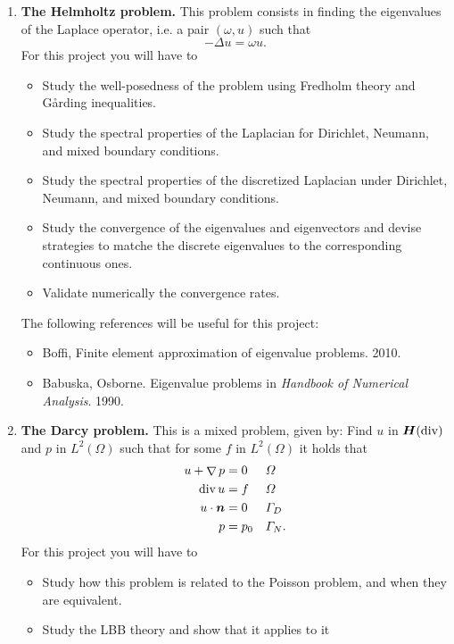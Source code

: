 \documentclass{article}
\renewcommand{\vec}{\vectorsym}
\DeclareMathOperator{\grad}{\nabla}
\DeclareMathOperator{\dive}{\text{div}}
\begin{document}
\begin{enumerate}
    \item \textbf{The Helmholtz problem.} This problem consists in finding the eigenvalues of the Laplace operator, i.e. a pair $(\omega, u)$ such that
        $$ -\Delta u = \omega u. $$
        For this project you will have to 
        \begin{itemize}
            \item Study the well-posedness of the problem using Fredholm theory and G\r arding inequalities.
            \item Study the spectral properties of the Laplacian for Dirichlet, Neumann, and mixed boundary conditions.
            \item Study the spectral properties of the discretized Laplacian under Dirichlet, Neumann, and mixed boundary conditions.
            \item Study the convergence of the eigenvalues and eigenvectors and devise strategies to matche the discrete eigenvalues to the corresponding continuous ones.
            \item Validate numerically the convergence rates.
        \end{itemize}
        The following references will be useful for this project: 
        \begin{itemize}
            \item Boffi, Finite element approximation of eigenvalue problems. 2010. 
            \item Babuska, Osborne. Eigenvalue problems in \emph{Handbook of Numerical Analysis}. 1990.
        \end{itemize}
    \item \textbf{The Darcy problem.} This is a mixed problem, given by: Find $u$ in $\vec H(\dive)$ and $p$ in $L^2(\Omega)$ such that for some $f$ in $L^2(\Omega)$ it holds that
        $$ \begin{aligned}
            u + \grad p &= 0 && \Omega \\
            \dive u     &= f && \Omega \\
            u\cdot \vec n &= 0 && \Gamma_D \\
            p           &= p_0 && \Gamma_N.
        \end{aligned} $$
        For this project you will have to 
        \begin{itemize}
            \item Study how this problem is related to the Poisson problem, and when they are equivalent.
            \item Study the LBB theory and show that it applies to it

\end{itemize}
\end{enumerate}
\end{document}
